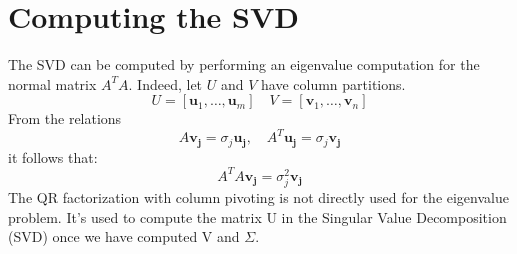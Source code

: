 \documentclass[11pt]{book}
\begin{document}
\section*{Computing the SVD}
The SVD can be computed by performing an eigenvalue computation for the normal matrix $A^{T} A$. Indeed, let $U$ and $V$ have column partitions.
$$
U=\left[\mathbf{u}_{1}, \ldots, \mathbf{u}_{m}\right] \quad V=\left[\mathbf{v}_{1}, \ldots, \mathbf{v}_{n}\right]
$$
From the relations
$$
A \mathbf{v}_{\mathbf{j}}=\sigma_{j} \mathbf{u}_{\mathbf{j}}, \quad A^{T} \mathbf{u}_{\mathbf{j}}=\sigma_{j} \mathbf{v}_{\mathbf{j}}
$$
it follows that:
$$
A^{T} A \mathbf{v}_{\mathbf{j}}=\sigma_{j}^{2} \mathbf{v}_{\mathbf{j}}
$$
The QR factorization with column pivoting is not directly used for the eigenvalue problem. It’s used to compute the matrix U in the Singular Value Decomposition (SVD) once we have computed V and $\Sigma$.  
\end{document}
